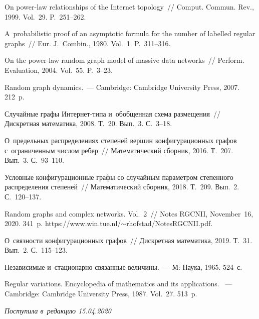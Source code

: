 \begin{multicols}{2}
{{\begin{thebibliography}{99}
On power-law relationships of the Internet topology~// Comput. Commun. Rev., 1999. Vol.~29. P.~251--262.

 A~probabilistic proof of an asymptotic formula
for the number of labelled regular graphs~// Eur. J.~Combin., 1980. Vol.~1. P.~311--316.

 On the power-law random graph model of massive
data networks~// Perform. Evaluation, 2004. Vol.~55. P.~3--23.

 Random graph dynamics.~--- Cambridge:
Cambridge University Press, 2007. 212~p.

 Случайные графы Ин\-тер\-нет-ти\-па 
и~обобщенная схема размещения~// Дискретная математика, 2008. Т.~20. Вып.~3. С.~3--18.

О~предельных распределениях степеней вершин конфигурационных графов с~ограниченным числом ребер~// 
Математический сборник, 2016. Т.~207. Вып.~3. С.~93--110.

 Условные конфигурационные графы со случайным параметром степенного распределения степеней~// 
Математический сборник, 2018. Т.~209. Вып.~2. С.~120--137.

 Random graphs and complex networks. Vol.~2~// 
Notes RGCNII, November~16, 2020. 341~p. {\sf https://www.win.tue.nl/$\sim$rhofstad/NotesRGCNII.pdf}.


 О~связности конфигурационных графов~// Дискретная математика, 2019. Т.~31. Вып.~2. С.~115--123.

Независимые и~стационарно связанные величины.~--- М: Наука, 1965. 524~с.

Regular variations. Encyclopedia of mathematics and its applications. ~--- 
Cambridge: Cambridge University Press, 1987. Vol.~27. 513~p.
\end{thebibliography}

}
}

\end{multicols}

\vspace*{-6pt}

\hfill{\small\textit{Поступила в~редакцию 15.04.2020}}

